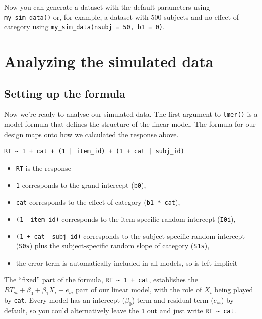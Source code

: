 \documentclass[doc,floatsintext]{apa6}
\providecommand{\tightlist}{%
  \setlength{\itemsep}{0pt}\setlength{\parskip}{0pt}}
\begin{document}
Now you can generate a dataset with the default parameters using
\texttt{my\_sim\_data()} or, for example, a dataset with 500 subjects
and no effect of category using
\texttt{my\_sim\_data(nsubj\ =\ 50,\ b1\ =\ 0)}.

\section{Analyzing the simulated
data}\label{analyzing-the-simulated-data}

\subsection{Setting up the formula}\label{setting-up-the-formula}

Now we're ready to analyse our simulated data. The first argument to
\texttt{lmer()} is a model formula that defines the structure of the
linear model. The formula for our design maps onto how we calculated the
response above.

\begin{verbatim}
RT ~ 1 + cat + (1 | item_id) + (1 + cat | subj_id)
\end{verbatim}

\begin{itemize}
\tightlist
\item
  \texttt{RT} is the response
\item
  \texttt{1} corresponds to the grand intercept (\texttt{b0}),
\item
  \texttt{cat} corresponds to the effect of category
  (\texttt{b1\ *\ cat}),
\item
  \texttt{(1\ \textbar{}\ item\_id)} corresponds to the item-specific
  random intercept (\texttt{I0i}),
\item
  \texttt{(1\ +\ cat\ \textbar{}\ subj\_id)} corresponds to the
  subject-specific random intercept (\texttt{S0s}) plus the
  subject-specific random slope of category (\texttt{S1s}),
\item
  the error term is automatically included in all models, so is left
  implicit
\end{itemize}

The \enquote{fixed} part of the formula,
\texttt{RT\ \textasciitilde{}\ 1\ +\ cat}, establishes the
\(RT_{si} + \beta_0 + \beta_1 X_i + e_{si}\) part of our linear model,
with the role of \(X_i\) being played by \texttt{cat}. Every model has
an intercept (\(\beta_0\)) term and residual term (\(e_{si}\)) by
default, so you could alternatively leave the \texttt{1} out and just
write \texttt{RT\ \textasciitilde{}\ cat}.
\end{document}
